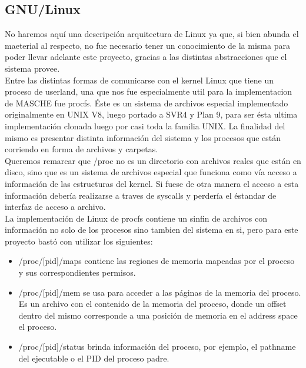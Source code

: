 \subsection{GNU/Linux}

No haremos aquí una descripción arquitectura de Linux ya que, si bien abunda el
maeterial al respecto, no fue necesario tener un conocimiento de la misma para
poder llevar adelante este proyecto, gracias a las distintas abstracciones que
el sistema provee.\\

Entre las distintas formas de comunicarse con el kernel Linux que tiene un
proceso de userland, una que nos fue especialmente util para la implementacion
de MASCHE fue procfs. Éste es un sistema de archivos especial implementado
originalmente en UNIX V8, luego portado a SVR4 y Plan 9, para ser ésta ultima
implementación clonada luego por casi toda la familia UNIX. La finalidad del
mismo es presentar distinta información del sistema y los procesos que están
corriendo en forma de archivos y carpetas.\\

Queremos remarcar que /proc no es un directorio con archivos reales que están
en disco, sino que es un sistema de archivos especial que funciona como vía
acceso a información de las estructuras del kernel. Si fuese de otra manera el
acceso a esta información debería realizarse a traves de syscalls y perdería el
éstandar de interfaz de acceso a archivo.\\

La implementación de Linux de procfs contiene un sinfin de archivos con
información no solo de los procesos sino tambien del sistema en si, pero para
este proyecto bastó con utilizar los siguientes:\\

\begin{itemize}

\item /proc/[pid]/maps contiene las regiones de memoria mapeadas por el proceso
    y sus correspondientes permisos.

\item /proc/[pid]/mem se usa para acceder a las páginas de la memoria del
    proceso. Es un archivo con el contenido de la memoria del proceso, donde un
    offset dentro del mismo corresponde a una posición de memoria en el address
    space el proceso.

\item /proc/[pid]/status brinda información del proceso, por ejemplo, el
    pathname del ejecutable o el PID del proceso padre.

\end{itemize}
